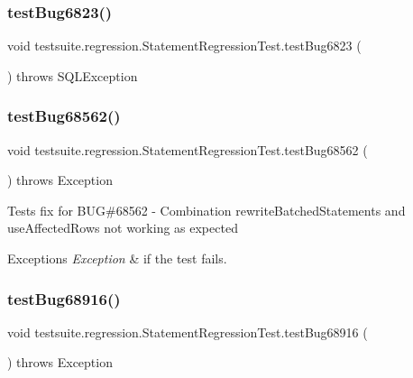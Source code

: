 \subsubsection{\texorpdfstring{test\+Bug6823()}{testBug6823()}}
{\footnotesize\ttfamily void testsuite.\+regression.\+Statement\+Regression\+Test.\+test\+Bug6823 (\begin{DoxyParamCaption}{ }\end{DoxyParamCaption}) throws S\+Q\+L\+Exception}

\mbox{\label{classtestsuite_1_1regression_1_1_statement_regression_test_a98f77aa1cdaf8554dcfff5b368c4e90a}} 
\subsubsection{\texorpdfstring{test\+Bug68562()}{testBug68562()}}
{\footnotesize\ttfamily void testsuite.\+regression.\+Statement\+Regression\+Test.\+test\+Bug68562 (\begin{DoxyParamCaption}{ }\end{DoxyParamCaption}) throws Exception}

Tests fix for B\+UG\#68562 -\/ Combination rewrite\+Batched\+Statements and use\+Affected\+Rows not working as expected


\begin{DoxyExceptions}{Exceptions}
{\em Exception} & if the test fails. \\
\hline
\end{DoxyExceptions}
\mbox{\label{classtestsuite_1_1regression_1_1_statement_regression_test_a23f5d3d3b8c4eb0019effe8aadd4b4b2}} 
\subsubsection{\texorpdfstring{test\+Bug68916()}{testBug68916()}}
{\footnotesize\ttfamily void testsuite.\+regression.\+Statement\+Regression\+Test.\+test\+Bug68916 (\begin{DoxyParamCaption}{ }\end{DoxyParamCaption}) throws Exception}

